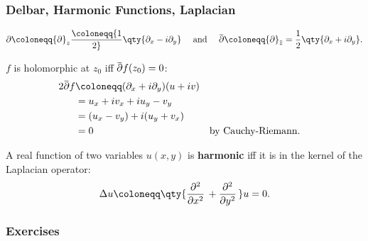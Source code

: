\hypertarget{delbar-harmonic-functions-laplacian}{%
\subsubsection{Delbar, Harmonic Functions,
Laplacian}\label{delbar-harmonic-functions-laplacian}}

\begin{definition}

\begin{align*}
{\partial}\coloneqq{\partial}_z \coloneqq{1\over 2}\qty{{\partial}_x - i {\partial}_y}
\quad
\text{ and }
\quad
\mkern 1.5mu\overline{\mkern-1.5mu{\partial}\mkern-1.5mu}\mkern 1.5mu
\coloneqq{\partial}_{\mkern 1.5mu\overline{\mkern-1.5muz\mkern-1.5mu}\mkern 1.5mu}
={1\over 2}\qty{ {\partial}_x + i{\partial}_y}
.\end{align*}

\end{definition}

\begin{proposition}

\(f\) is holomorphic at \(z_0\) iff
\(\mkern 1.5mu\overline{\mkern-1.5mu{\partial}\mkern-1.5mu}\mkern 1.5muf(z_0) = 0\):
\begin{align*}
2\mkern 1.5mu\overline{\mkern-1.5mu{\partial}\mkern-1.5mu}\mkern 1.5muf 
&\coloneqq({\partial}_x + i {\partial}_y) (u+iv) \\
&= u_x + iv_x + iu_y - v_y \\
&= (u_x - v_y) + i(u_y + v_x) \\
&= 0 && \text{by Cauchy-Riemann}
.\end{align*}

\end{proposition}

\begin{definition}

A real function of two variables \(u(x, y)\) is \textbf{harmonic} iff it
is in the kernel of the Laplacian operator:
\begin{align*}  
\Delta u \coloneqq\qty{{\frac{\partial ^2}{\partial x^2}\,} + {\frac{\partial ^2}{\partial y^2}\,}}u = 0
.\end{align*}

\end{definition}

\hypertarget{exercises-1}{%
\subsubsection{Exercises}\label{exercises-1}}

